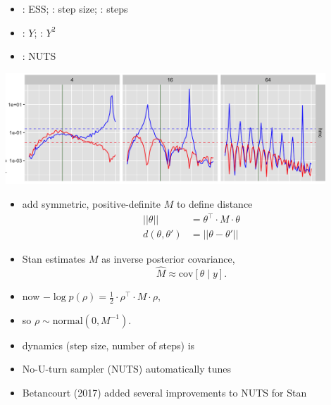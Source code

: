 \documentclass[9pt]{report}
\begin{document}
\begin{itemize}
\item {}: ESS; \qquad {}:  step size; \qquad
  : steps
\item {}: $Y$; \qquad {}: $Y^2$
\item {}: NUTS
\end{itemize}
\begin{center}
  \includegraphics[width=0.9\textwidth]{img/hmc-jitter.png}
\end{center}  

\begin{itemize}
\item add symmetric, positive-definite  $M$ to
  define distance
  \begin{align}
    ||\theta|| &= \theta^{\top} \cdot M \cdot \theta
    \\[8pt]
  d(\theta, \theta') &= ||\theta - \theta'||
  \end{align}
\item Stan estimates $M$ as inverse posterior covariance,
  $$
  \widehat{M} \approx \textrm{cov}[\theta \mid y].
  $$
\item {} now $-\log p(\rho) = \frac{1}{2} \cdot \rho^{\top} \cdot M \cdot \rho,$
\item so  $\rho \sim \textrm{normal}(0, M^{-1}).$
\end{itemize}


\begin{itemize}
\item {} dynamics (step size, number of steps) is
\item No-U-turn sampler (NUTS) automatically tunes
\item Betancourt (2017) added several improvements to NUTS for Stan
\end{itemize}
\end{document}
